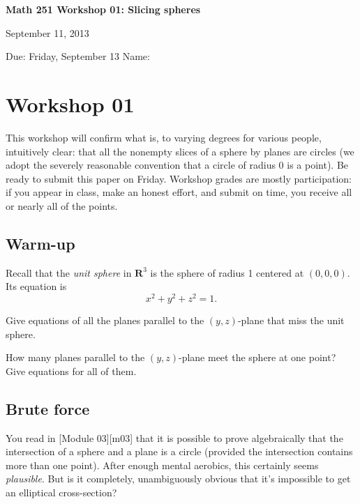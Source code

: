\documentclass[12pt]{exam}
\theoremstyle{definition}
\begin{document}
\lstset{language=R}
\noindent
\textbf{{\large Math 251 \hfill Workshop 01: Slicing spheres}}

\noindent
September 11, 2013 

\noindent
Due: Friday, September 13 \hfill Name: \underline{\hspace{3in}} 

\noindent

\section{Workshop 01}

This workshop will confirm what is, to varying degrees for various
people, intuitively clear: that all the nonempty slices of a sphere by
planes are circles (we adopt the severely reasonable convention that a
circle of radius 0 is a point). Be ready to submit this paper on Friday.
Workshop grades are mostly participation: if you appear in class, make
an honest effort, and submit on time, you receive all or nearly all of
the points.

\subsection{Warm-up}

Recall that the \emph{unit sphere} in $\mathbf{R}^3$ is the sphere of
radius 1 centered at $(0,0,0)$. Its equation is
\[ x^2 + y^2 + z^2 = 1. \]

\begin{questions}

\question Give equations of all the planes parallel to the $(y,z)$-plane that miss the unit sphere.

\question How many planes parallel to the $(y,z)$-plane meet the sphere at one point? Give equations for all of them.
 
\end{questions}

\subsection{Brute force}

You read in {[}Module 03{]}{[}m03{]} that it is possible to prove
algebraically that the intersection of a sphere and a plane is a circle
(provided the intersection contains more than one point). After enough
mental aerobics, this certainly seems \emph{plausible}. But is it
completely, unambiguously obvious that it's impossible to get an
elliptical cross-section?
\end{document}
